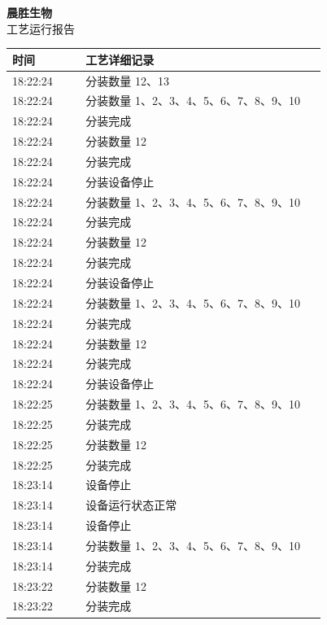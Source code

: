 \documentclass[UTF8,10pt,a4paper,fontset=fandol]{ctexart}
\begin{document}
\begin{minipage}[t]{0.47\linewidth}
\centering
\textbf{晨胜生物}\\
工艺运行报告

\smallskip
\begin{tabular}{|p{0.22\linewidth}|p{0.72\linewidth}|}
\hline
时间&工艺详细记录\\
\hline
18:22:24&分装数量 12、13\\
18:22:24&分装数量 1、2、3、4、5、6、7、8、9、10\\
18:22:24&分装完成\\
18:22:24&分装数量 12\\
18:22:24&分装完成\\
18:22:24&分装设备停止\\
18:22:24&分装数量 1、2、3、4、5、6、7、8、9、10\\
18:22:24&分装完成\\
18:22:24&分装数量 12\\
18:22:24&分装完成\\
18:22:24&分装设备停止\\
18:22:24&分装数量 1、2、3、4、5、6、7、8、9、10\\
18:22:24&分装完成\\
18:22:24&分装数量 12\\
18:22:24&分装完成\\
18:22:24&分装设备停止\\
18:22:25&分装数量 1、2、3、4、5、6、7、8、9、10\\
18:22:25&分装完成\\
18:22:25&分装数量 12\\
18:22:25&分装完成\\
18:23:14&设备停止\\
18:23:14&设备运行状态正常\\
18:23:14&设备停止\\
18:23:14&分装数量 1、2、3、4、5、6、7、8、9、10\\
18:23:14&分装完成\\
18:23:22&分装数量 12\\
18:23:22&分装完成\\
\hline
\end{tabular}
\end{minipage}
\hfill
\end{document}
